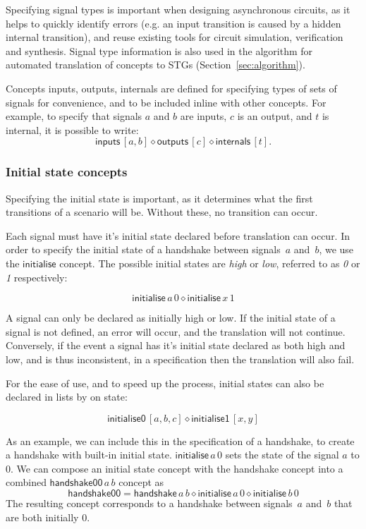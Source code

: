 \documentclass[british,conference,compsoc]{IEEEtran}
\begin{document}
\noindent Specifying signal types is important when designing asynchronous
circuits, as it helps to quickly identify errors (e.g. an input transition is
caused by a hidden internal transition), and reuse existing tools for circuit
simulation, verification and synthesis. Signal type information is also used
in the algorithm for automated translation of concepts to
STGs (Section~\ref{sec:algorithm}).

Concepts \textsf{inputs}, \textsf{outputs}, \textsf{internals} are defined for
specifying types of sets of signals for convenience, and to be included inline with other
concepts. For example, to specify
that signals $a$ and $b$ are inputs, $c$ is an output, and $t$ is internal, it
is possible to write:
\[
\mathsf{inputs}\,[a, b] \diamond \mathsf{outputs}\,[c] \diamond
\mathsf{internals}\,[t].
\]


\subsubsection{Initial state concepts\label{sub:initState}}

Specifying the initial state is important, as it determines what the first transitions
of a scenario will be. Without these, no transition can occur.

Each signal must have it's initial state declared before translation can occur. 
In order to specify the initial state of a handshake between signals~$a$
and~$b$, we use the $\mathsf{initialise}$ concept.
The possible initial states are \emph{high} or \emph{low}, referred to as \emph{0} 
or \emph{1} respectively:

\[
\mathsf{initialise}\,a\,0 \diamond \mathsf{initialise}\,x\, 1
\]

\noindent A signal can only be declared as initially high or low. If the initial state of a signal is 
not defined, an error will occur, and the translation will not continue. Conversely, 
if the event a signal has it's initial state declared as both high and low,
and is thus inconsistent, in a specification then the translation will also fail.

For the ease of use, and to speed up the process, initial states can also be declared
in lists by on state:

\[
\mathsf{initialise0}\, [a, b, c] \diamond \mathsf{initialise1}\, [x, y]
\]


\noindent As an example, we can include this in the specification of a handshake, to 
create a handshake with built-in initial state.
$\mathsf{initialise}\,a\, 0$ sets the state of the signal
$a$ to $0$. We can compose an initial state concept with the handshake concept
into a combined $\mathsf{handshake00}\,a\, b$ concept as
\[
\mathsf{handshake00} = \mathsf{handshake}\,a\, b \diamond \mathsf{initialise}\,a\, 0 \diamond
\mathsf{initialise}\,b\, 0
\]
The resulting concept corresponds to a handshake between signals~$a$
and~$b$ that are both initially $0$.
\end{document}

